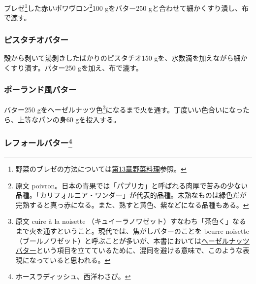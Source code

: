 \begin{recette}
ブレゼ\footnote{野菜のブレゼの方法については\protect\hyperlink{}{第13章野菜料理}参照。}した赤いポワヴロン\footnote{原文
  poivron。日本の青果では「パプリカ」と呼ばれる肉厚で苦みの少ない品種。「カリフォルニア・ワンダー」が代表的品種。未熟なものは緑色だが完熟すると真っ赤になる。また、熟すと黄色、紫などになる品種もある。}100
gをバター250 gと合わせて細かくすり潰し、布で漉す。

\hypertarget{beurre-de-pistache}{%
\subsubsection{ピスタチオバター}\label{beurre-de-pistache}}



殻から剥いて湯剥きしたばかりのピスタチオ150
gを、水数滴を加えながら細かくすり潰す。パター250 gを加え、布で漉す。

\hypertarget{beurre-a-la-polonaise}{%
\subsubsection{ポーランド風バター}\label{beurre-a-la-polonaise}}



バター250 gをヘーゼルナッツ色\footnote{原文 cuire à la noisette
  （キュイーラノワゼット）すなわち「茶色く」なるまで火を通すということ。現代では、焦がしバターのことを
  beurre noisette
  （ブールノワゼット）と呼ぶことが多いが、本書においては\protect\hyperlink{beurre-de-noisette}{ヘーゼルナッツバター}という項目を立てているために、混同を避ける意味で、このような表現になっていると思われる。}になるまで火を通す。丁度いい色合いになったら、上等なパンの身60
gを投入する。

\hypertarget{beurre-de-raifort}{%
\subsubsection[レフォールバター]{\texorpdfstring{レフォールバター\footnote{ホースラディッシュ、西洋わさび。}}{レフォールバター}}\label{beurre-de-raifort}}


\end{recette}
